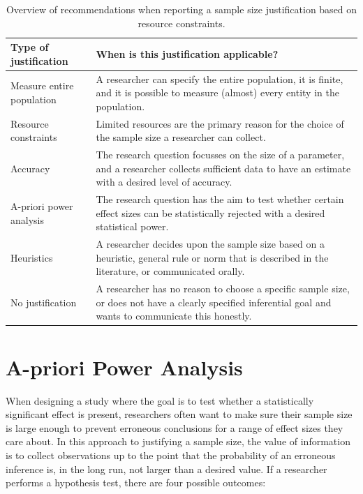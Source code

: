 \documentclass[
]{krantz}
\begin{document}
\begin{table}

\caption{\label{tab:table-pow-rec}Overview of recommendations when reporting a sample size justification based on resource constraints.}
\centering
\begin{tabular}[t]{l|l}
\hline
Type of justification & When is this justification applicable?\\
\hline
Measure entire population & A researcher can specify the entire population, it is finite, and it is possible to measure (almost) every entity in the population.\\
\hline
Resource constraints & Limited resources are the primary reason for the choice of the sample size a researcher can collect.\\
\hline
Accuracy & The research question focusses on the size of a parameter, and a researcher collects sufficient data to have an estimate with a desired level of accuracy.\\
\hline
A-priori power analysis & The research question has the aim to test whether certain effect sizes can be statistically rejected with a desired statistical power.\\
\hline
Heuristics & A researcher decides upon the sample size based on a heuristic, general rule or norm that is described in the literature, or communicated orally.\\
\hline
No justification & A researcher has no reason to choose a specific sample size, or does not have a clearly specified inferential goal and wants to communicate this honestly.\\
\hline
\end{tabular}
\end{table}

\hypertarget{a-priori-power-analysis}{%
\section{A-priori Power Analysis}\label{a-priori-power-analysis}}

When designing a study where the goal is to test whether a statistically significant effect is present, researchers often want to make sure their sample size is large enough to prevent erroneous conclusions for a range of effect sizes they care about. In this approach to justifying a sample size, the value of information is to collect observations up to the point that the probability of an erroneous inference is, in the long run, not larger than a desired value. If a researcher performs a hypothesis test, there are four possible outcomes:
\end{document}
